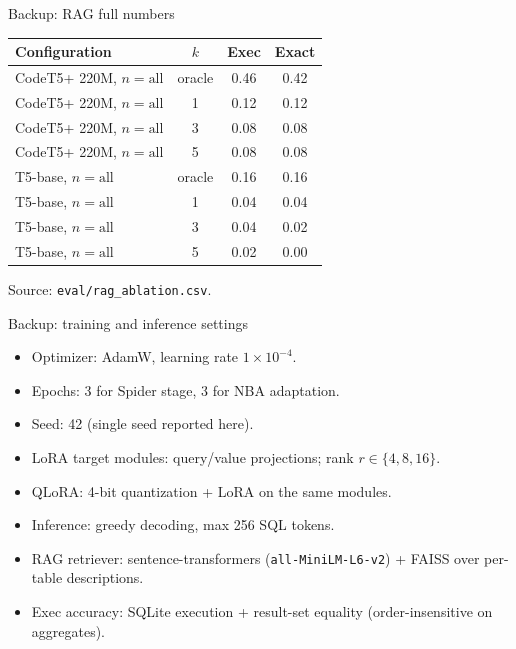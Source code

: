 \documentclass[aspectratio=169,11pt]{beamer}
\begin{document}
\begin{frame}{Backup: RAG full numbers}
  \centering\small
  \begin{tabular}{lccc}
    \toprule
    \textbf{Configuration} & \textbf{$k$} & \textbf{Exec} & \textbf{Exact} \\
    \midrule
    CodeT5+ 220M, $n{=}\text{all}$ & oracle & 0.46 & 0.42 \\
    CodeT5+ 220M, $n{=}\text{all}$ & 1      & 0.12 & 0.12 \\
    CodeT5+ 220M, $n{=}\text{all}$ & 3      & 0.08 & 0.08 \\
    CodeT5+ 220M, $n{=}\text{all}$ & 5      & 0.08 & 0.08 \\
    \midrule
    T5-base, $n{=}\text{all}$ & oracle & 0.16 & 0.16 \\
    T5-base, $n{=}\text{all}$ & 1      & 0.04 & 0.04 \\
    T5-base, $n{=}\text{all}$ & 3      & 0.04 & 0.02 \\
    T5-base, $n{=}\text{all}$ & 5      & 0.02 & 0.00 \\
    \bottomrule
  \end{tabular}

  \vspace{4pt}
  {\footnotesize Source: \texttt{eval/rag\_ablation.csv}.}
\end{frame}

\begin{frame}{Backup: training and inference settings}
  \begin{itemize}
    \item Optimizer: AdamW, learning rate $1{\times}10^{-4}$.
    \item Epochs: 3 for Spider stage, 3 for NBA adaptation.
    \item Seed: 42 (single seed reported here).
    \item LoRA target modules: query/value projections; rank $r \in \{4,8,16\}$.
    \item QLoRA: 4-bit quantization + LoRA on the same modules.
    \item Inference: greedy decoding, max 256 SQL tokens.
    \item RAG retriever: sentence-transformers (\texttt{all-MiniLM-L6-v2}) + FAISS over per-table descriptions.
    \item Exec accuracy: SQLite execution + result-set equality (order-insensitive on aggregates).
  \end{itemize}
\end{frame}
\end{document}
